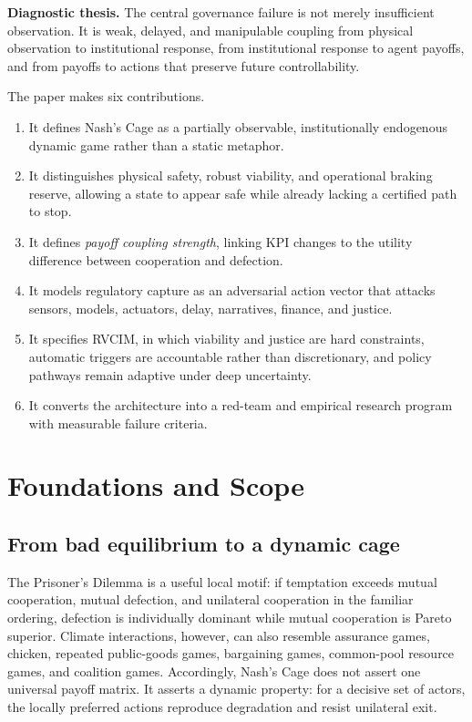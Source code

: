 \documentclass[11pt,a4paper]{article}
\numberwithin{equation}{section}
\theoremstyle{definition}
\theoremstyle{plain}
\theoremstyle{remark}
\newcommand{\RVCIM}{\textsc{RVCIM}}
\begin{document}
\begin{corebox}
\textbf{Diagnostic thesis.} The central governance failure is not merely insufficient observation. It is weak, delayed, and manipulable coupling from physical observation to institutional response, from institutional response to agent payoffs, and from payoffs to actions that preserve future controllability.
\end{corebox}

The paper makes six contributions.

\begin{enumerate}
  \item It defines Nash's Cage as a partially observable, institutionally endogenous dynamic game rather than a static metaphor.
  \item It distinguishes physical safety, robust viability, and operational braking reserve, allowing a state to appear safe while already lacking a certified path to stop.
  \item It defines \emph{payoff coupling strength}, linking KPI changes to the utility difference between cooperation and defection.
  \item It models regulatory capture as an adversarial action vector that attacks sensors, models, actuators, delay, narratives, finance, and justice.
  \item It specifies \RVCIM, in which viability and justice are hard constraints, automatic triggers are accountable rather than discretionary, and policy pathways remain adaptive under deep uncertainty.
  \item It converts the architecture into a red-team and empirical research program with measurable failure criteria.
\end{enumerate}

\section{Foundations and Scope}

\subsection{From bad equilibrium to a dynamic cage}

The Prisoner's Dilemma is a useful local motif: if temptation exceeds mutual cooperation, mutual defection, and unilateral cooperation in the familiar ordering, defection is individually dominant while mutual cooperation is Pareto superior. Climate interactions, however, can also resemble assurance games, chicken, repeated public-goods games, bargaining games, common-pool resource games, and coalition games. Accordingly, Nash's Cage does not assert one universal payoff matrix. It asserts a dynamic property: for a decisive set of actors, the locally preferred actions reproduce degradation and resist unilateral exit.
\end{document}
